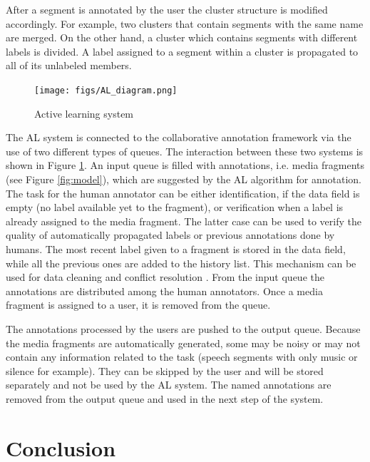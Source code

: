 \documentclass[10pt, a4paper]{article}
\begin{document}
After a segment is annotated by the user the cluster structure is modified accordingly. For example, two clusters that contain segments with the same name are merged. On the other hand, a cluster which contains segments with different labels is divided. A label assigned to a segment within a cluster is propagated to all of its unlabeled members. 

\begin{figure}[htb]
 \center 
 \texttt{[image: figs/AL\_diagram.png]}
 \centering
 \caption {Active learning system}
 \label{fig:ALdiagram}
\end{figure}


The AL system is connected to the collaborative annotation framework via the use of two different types of queues. The interaction between these two systems is shown in Figure \ref{fig:ALdiagram}. An input queue is filled with annotations, i.e. media fragments (see Figure \ref{fig:model}), which are suggested by the AL algorithm for annotation. The task for the human annotator can be either identification, if the data field is empty (no label available yet to the fragment), or verification when a label is already assigned to the media fragment. The latter case can be used to verify the quality of automatically propagated labels or previous annotations done by humans. The most recent label given to a fragment is stored in the data field, while all the previous ones are added to the history list. This mechanism can be used for data cleaning and conflict resolution \cite{Safadi2012}. From the input queue the annotations are distributed among the human annotators. Once a media fragment is assigned to a user, it is removed from the queue. 

The annotations processed by the users are pushed to the output queue. Because the media fragments are automatically generated, some may be noisy or may not contain any information related to the task (speech segments with only music or silence for example). They can be skipped by the user and will be stored separately and not be used by the AL system. The named annotations are removed from the output queue and used in the next step of the system.


\section{Conclusion}
\end{document}
